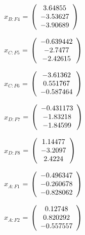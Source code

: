 \begin{description}
$x_{B:F4}$ = $\left( \begin{array} {ccc}    3.64855 \\   -3.53627 \\   -3.90689
\end{array} \right)\\ \\$
              
$x_{C:F5}$ = $\left( \begin{array} {ccc}  -0.639442 \\    -2.7477 \\   -2.42615
\end{array} \right)\\ \\$
              
$x_{C:F6}$ = $\left( \begin{array} {ccc}   -3.61362 \\   0.551767 \\  -0.587464
\end{array} \right)\\ \\$
             
$x_{D:F7}$ = $\left( \begin{array} {ccc}  -0.431173 \\   -1.83218 \\   -1.84599
\end{array} \right)\\ \\$
              
$x_{D:F8}$ = $\left( \begin{array} {ccc}    1.14477 \\    -3.2097 \\     2.4224
\end{array} \right)\\ \\$
       
$\hat{x}_{A:F1}$ = $\left( \begin{array} {ccc}  -0.496347 \\  -0.260678 \\  -0.828062
\end{array} \right)\\ \\$

$\hat{x}_{A:F2}$ = $\left( \begin{array} {ccc}    0.12748 \\   0.820292 \\  -0.557557
\end{array} \right)\\ \\$


\end{description}
